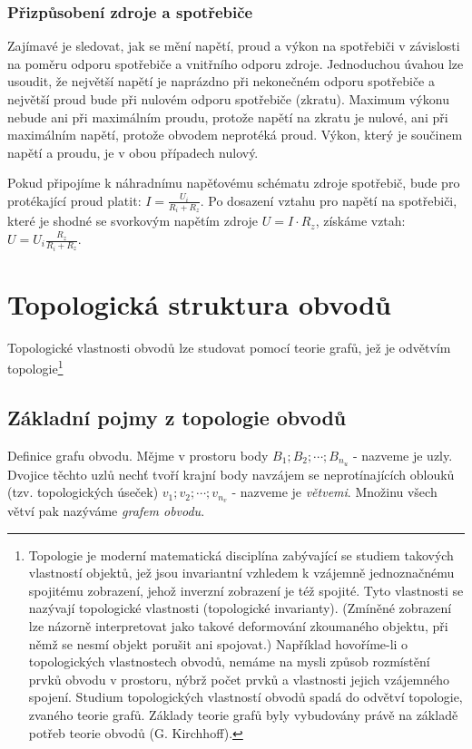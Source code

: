       \subsubsection{Přizpůsobení zdroje a spotřebiče}
        Zajímavé je sledovat, jak se mění napětí, proud a výkon na spotřebiči v závislosti na 
        poměru odporu spotřebiče a vnitřního odporu zdroje. Jednoduchou úvahou lze usoudit, že 
        největší napětí je naprázdno při nekonečném odporu spotřebiče a největší proud bude při 
        nulovém odporu spotřebiče (zkratu). Maximum výkonu nebude ani při maximálním proudu, 
        protože napětí na zkratu je nulové, ani při maximálním napětí, protože obvodem neprotéká 
        proud. Výkon, který je součinem napětí a proudu, je v obou případech nulový.
        
        Pokud připojíme k náhradnímu napěťovému schématu zdroje spotřebič, bude pro protékající 
        proud platit: \(I = \frac{U_i}{R_i + R_z}\). Po dosazení vztahu pro napětí na spotřebiči, 
        které je shodné se svorkovým napětím zdroje \(U=I\cdot R_z\), získáme vztah: \(U = 
        U_i\frac{R_z}{R_i + R_z}\).
        
  \section{Topologická struktura obvodů}
    Topologické vlastnosti obvodů lze studovat pomocí teorie grafů, jež je odvětvím 
    topologie\footnote{Topologie je moderní	matematická disciplína zabývající se studiem takových 
    vlastností objektů, jež jsou invariantní vzhledem k vzájemně jednoznačnému spojitému zobrazení, 
    jehož inverzní zobrazení je též spojité. Tyto vlastnosti se nazývají topologické vlastnosti 
    (topologické invarianty). (Zmíněné zobrazení lze názorně interpretovat jako takové deformování 
    zkoumaného objektu, při němž se nesmí objekt porušit ani spojovat.) Například hovoříme-li o 
    topologických vlastnostech obvodů, nemáme na mysli způsob rozmístění prvků obvodu v prostoru, 
    nýbrž počet prvků a vlastnosti jejich vzájemného spojení. Studium topologických vlastností 
    obvodů spadá do odvětví topologie, zvaného teorie grafů. Základy teorie grafů byly vybudovány 
    právě na základě potřeb teorie obvodů (G. Kirchhoff).}
    
    \subsection{Základní pojmy z topologie obvodů}
      Definice grafu obvodu. Mějme v prostoru body \(B_1; B_2;\cdots; B_{n_u}\) - nazveme je uzly. 
      Dvojice těchto uzlů nechť tvoří krajní body navzájem se neprotínajících oblouků (tzv. 
      topologických úseček) \(v_1; v_2; \cdots; v_{n_v}\) - nazveme je \emph{větvemi}. Množinu 
      všech větví pak nazýváme \emph{grafem obvodu}.
      
